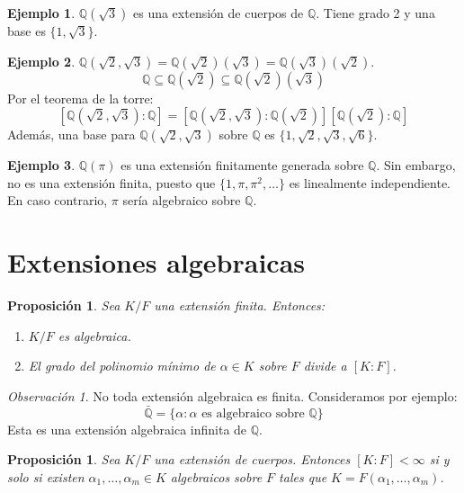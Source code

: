 \documentclass{report}
\newtheorem{proposition}[theorem]{Proposición}
\theoremstyle{remark}
\newtheorem*{remark}{Observación}
\theoremstyle{definition}
\theoremstyle{definition}
\theoremstyle{definition}
\newtheorem*{example}{Ejemplo}
\begin{document}
\begin{example}
    $\mathbb{Q}(\sqrt{3})$ es una extensión de cuerpos de $\mathbb{Q}$. Tiene grado 2 y una base es $\{ 1, \sqrt{3} \}$.
\end{example}

\begin{example}
    $\mathbb{Q}(\sqrt{2}, \sqrt{3}) = \mathbb{Q}(\sqrt{2})(\sqrt{3}) = \mathbb{Q}(\sqrt{3})(\sqrt{2}).$
    $$\mathbb{Q} \subseteq \mathbb{Q}(\sqrt{2}) \subseteq \mathbb{Q}(\sqrt{2})(\sqrt{3})$$
    Por el teorema de la torre:
    $$[\mathbb{Q}(\sqrt{2}, \sqrt{3}) : \mathbb{Q}] = [\mathbb{Q}(\sqrt{2}, \sqrt{3}) : \mathbb{Q}(\sqrt{2})] [\mathbb{Q}(\sqrt{2}) : \mathbb{Q}]$$
    Además, una base para $\mathbb{Q}(\sqrt{2}, \sqrt{3})$ sobre $\mathbb{Q}$ es $\{ 1, \sqrt{2}, \sqrt{3}, \sqrt{6} \}$.
\end{example}

\begin{example}
    $\mathbb{Q}(\pi)$ es una extensión finitamente generada sobre $\mathbb{Q}$.
    Sin embargo, no es una extensión finita, puesto que $\{ 1, \pi, \pi^2, \dots \}$ es linealmente independiente.
    En caso contrario, $\pi$ sería algebraico sobre $\mathbb{Q}$.
\end{example}

\section{Extensiones algebraicas}

\begin{proposition}
    Sea $K/F$ una extensión finita. Entonces:
    \begin{enumerate}
        \item $K/F$ es algebraica.
        \item El grado del polinomio mínimo de $\alpha \in K$ sobre $F$ divide a $[K : F]$.
    \end{enumerate}
\end{proposition}

\begin{remark}
    No toda extensión algebraica es finita. Consideramos por ejemplo:
    $$\bar{\mathbb{Q}} = \{ \alpha : \alpha \text{ es algebraico sobre } \mathbb{Q} \}$$
    Esta es una extensión algebraica infinita de $\mathbb{Q}$.
\end{remark}

\begin{proposition}
    Sea $K/F$ una extensión de cuerpos. Entonces $[K : F] < \infty$ si y solo si existen $\alpha_1, \dots, \alpha_m \in K$ algebraicos sobre $F$ tales que $K = F(\alpha_1, \dots, \alpha_m)$.
\end{proposition}
\end{document}
